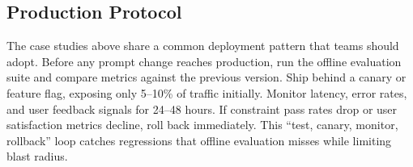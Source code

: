 \subsection{Production Protocol}

The case studies above share a common deployment pattern that teams should adopt. Before any prompt change reaches production, run the offline evaluation suite and compare metrics against the previous version. Ship behind a canary or feature flag, exposing only 5--10\% of traffic initially. Monitor latency, error rates, and user feedback signals for 24--48 hours. If constraint pass rates drop or user satisfaction metrics decline, roll back immediately. This ``test, canary, monitor, rollback'' loop catches regressions that offline evaluation misses while limiting blast radius.
